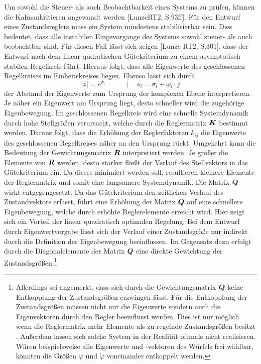 Um sowohl die Steuer- als auch Beobachtbarkeit eines Systems zu prüfen, können die Kalmankritieren angewandt werden [LunzeRT2, S.93ff]. Für den Entwurf eines Zustandsreglers muss ein System mindestens stabilisierbar sein. Dies bedeutet, dass alle instabilen Eingevorgänge des Systems sowohl steuer- als auch beobachtbar sind. Für diesen Fall lässt sich zeigen [Lunze RT2, S.301], dass der Entwurf nach dem linear qudratischen Gütekriterium zu einem asymptotisch stabilen Regelkreis führt. Hieraus folgt, dass alle Eigenwerte des geschlossenen Regelkreises im Einheitskreises liegen. Ebenso lässt sich durch
\begin{equation}
\vert z\vert = e^{\sigma_i} \hspace{35pt} \vert \hspace{15pt} s_i = \sigma_i + \omega_i\cdot j
\end{equation}
der Abstand der Eigenwerte zum Ursprung der komplexen Ebene interpretieren. Je näher ein Eigenwert am Ursprung liegt, desto schneller wird die zugehörige Eigenbewegung. Im geschlossenen Regelkreis wird eine schnelle Systemdynamik durch hohe Stellgrößen verursacht, welche durch die Reglermatrix $\boldsymbol{K}$ bestimmt werden. Daraus folgt, dass die Erhöhung der Reglerfaktoren $k_{ij}$ die Eigenwerte des geschlossenen Regelkreises näher an den Ursprung rückt. Umgekehrt kann die Bedeutung der Gewichtungsmatrix $\boldsymbol{R}$ interpretiert werden. Je größer die Elemente von $\boldsymbol{R}$ werden, desto stärker fließt der Verlauf des Stellvektors in das Gütekriterium ein. Da dieses minimiert werden soll, resultieren kleinere Elemente der Reglermatrix und somit eine langsamere Systemdynamik.
Die Matrix $\boldsymbol{Q}$ wirkt entgegengesetzt. Da das Gütekriterium den zeitlichen Verlauf des Zustandvektors erfasst, führt eine Erhöhung der Matrix $\boldsymbol{Q}$ auf eine schnellere Eigenbewegung, welche durch erhöhte Reglerelemente erreicht wird. Hier zeigt sich ein Vorteil der linear quadratisch optimalen Regelung. Bei dem Entwurf durch Eigenwertvorgabe lässt sich der Verlauf einer Zustandsgröße nur indirekt durch die Definition der Eigenbewegung beeinflussen. Im Gegensatz dazu erfolgt durch die Diagonalelemente der Matrix $\boldsymbol{Q}$ eine direkte Gewichtung der Zustandsgrößen.\footnote{Allerdings sei angemerkt, dass sich durch die Gewichtungsmatrix $\boldsymbol{Q}$ keine Entkopplung der Zustandsgrößen erzwingen lässt. Für die Entkopplung der Zustandsgrößen müssen nicht nur die Eigenwerte sondern auch die Eigenvektoren durch den Regler beeinflusst werden. Dies ist nur möglich wenn die Reglermatrix mehr Elemente als zu regelnde Zustandsgrößen besitzt \cite[S. 254 ff.]{LunzeRT2}. Außerdem lassen sich solche System in der Realität oftmals nicht realisieren. Wären beispielsweise alle Eigenwerte und -vektoren des Würfels frei wählbar, könnten die Größen $\varphi$ und $\dot{\varphi}$ voneinander entkoppelt werden.}
